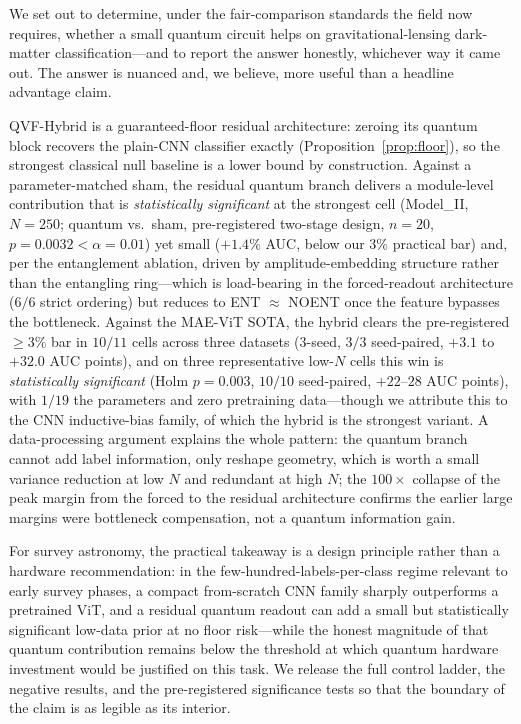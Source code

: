 \documentclass[10pt,letterpaper]{article}
\theoremstyle{plain}
\theoremstyle{definition}
\begin{document}
We set out to determine, under the fair-comparison standards the field now
requires, whether a small quantum circuit helps on gravitational-lensing
dark-matter classification---and to report the answer honestly, whichever way it
came out. The answer is nuanced and, we believe, more useful than a headline
advantage claim.

QVF-Hybrid is a guaranteed-floor residual architecture: zeroing its quantum block
recovers the plain-CNN classifier exactly (Proposition~\ref{prop:floor}), so the
strongest classical null baseline is a lower bound by construction. Against a
parameter-matched sham, the residual quantum branch delivers a module-level
contribution that is \emph{statistically significant} at the strongest cell
(Model\_II, $N{=}250$; quantum vs.\ sham, pre-registered two-stage design,
$n{=}20$, $p{=}0.0032 < \alpha{=}0.01$) yet small ($+1.4\%$ AUC, below our $3\%$
practical bar) and, per the entanglement ablation, driven by amplitude-embedding
structure rather than the entangling ring---which is load-bearing in the
forced-readout architecture ($6/6$ strict ordering) but reduces to
ENT $\approx$ NOENT once the feature bypasses the bottleneck. Against the MAE-ViT
SOTA, the hybrid clears the pre-registered $\geq3\%$ bar in $10/11$ cells across
three datasets ($3$-seed, $3/3$ seed-paired, $+3.1$ to $+32.0$ AUC points), and
on three representative low-$N$ cells this win is \emph{statistically significant}
(Holm $p{=}0.003$, $10/10$ seed-paired, $+22$--$28$ AUC points), with $1/19$ the
parameters and zero pretraining data---though we attribute this to the CNN
inductive-bias family, of which the hybrid is the strongest variant. A data-processing argument explains the whole
pattern: the quantum branch cannot add label information, only reshape geometry,
which is worth a small variance reduction at low $N$ and redundant at high $N$;
the $100\times$ collapse of the peak margin from the forced to the residual
architecture confirms the earlier large margins were bottleneck compensation, not
a quantum information gain.

For survey astronomy, the practical takeaway is a design principle rather than a
hardware recommendation: in the few-hundred-labels-per-class regime relevant to
early survey phases, a compact from-scratch CNN family sharply outperforms a
pretrained ViT, and a residual quantum readout can add a small but statistically
significant low-data prior at no floor risk---while the honest magnitude of that
quantum contribution remains below the threshold at which quantum hardware
investment would be justified on this task. We release the full control ladder,
the negative results, and the pre-registered significance tests so that the
boundary of the claim is as legible as its interior.
\end{document}
